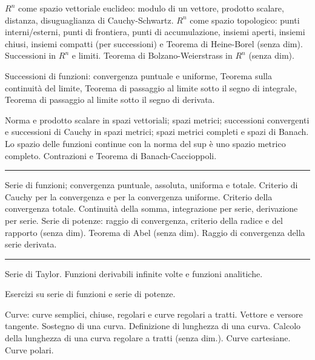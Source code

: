 \documentclass[a4paper,10pt]{article} %
\begin{document}
\begin{center}{
\today
\end{center}

\small


\begin{multicols}{2}


$R^n$ come spazio vettoriale euclideo: modulo di un vettore, prodotto scalare, distanza, disuguaglianza di Cauchy-Schwartz. $R^n$ come spazio topologico: punti interni/esterni, punti di frontiera, punti di accumulazione, insiemi aperti, insiemi chiusi, insiemi compatti (per successioni) e Teorema di Heine-Borel (senza dim). Successioni in $R^n$ e limiti. Teorema di Bolzano-Weierstrass in $R^n$ (senza dim).

Successioni di funzioni: convergenza puntuale e uniforme, Teorema sulla continuità del limite, Teorema di passaggio al limite sotto il segno di integrale, Teorema di passaggio al limite sotto il segno di derivata. 

Norma e prodotto scalare in spazi vettoriali; spazi metrici; successioni convergenti e successioni di Cauchy in spazi metrici; spazi metrici completi e spazi di Banach. Lo spazio delle funzioni continue con la norma del sup è uno spazio metrico completo. Contrazioni e Teorema di Banach-Caccioppoli.


\bigbreak
\hrule
\bigbreak





Serie di funzioni; convergenza puntuale, assoluta, uniforma e totale. Criterio di Cauchy per la convergenza e per la convergenza uniforme. Criterio della convergenza totale. Continuità della somma, integrazione per serie, derivazione per serie.
Serie di potenze: raggio di convergenza, criterio della radice e del rapporto (senza dim). Teorema di Abel (senza dim). Raggio di convergenza della serie derivata.



\bigbreak
\hrule
\bigbreak



Serie di Taylor. Funzioni derivabili infinite volte e funzioni analitiche.

Esercizi su serie di funzioni e serie di potenze.

Curve: curve semplici, chiuse, regolari e curve regolari a tratti. Vettore e versore tangente. Sostegno di una curva. Definizione di lunghezza di una curva. Calcolo della lunghezza di una curva regolare a tratti (senza dim.). Curve cartesiane. Curve polari.




\end{multicols}
\end{document}
